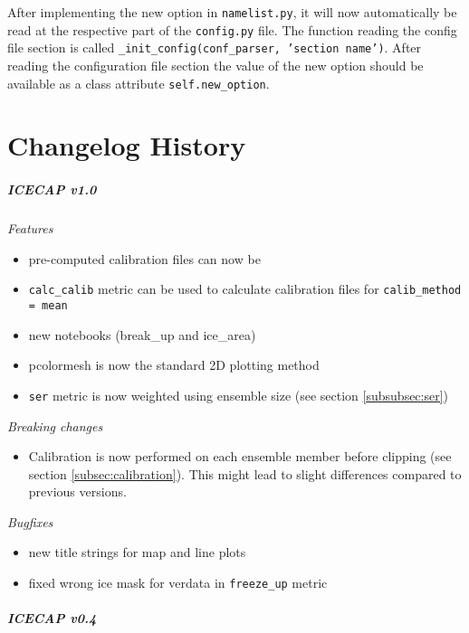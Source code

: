 \documentclass[DIV=10, parskip=full]{scrreprt}
\newcommand{\ice}{\textit{ICECAP}\xspace}
\begin{document}
After implementing the new option in \texttt{namelist.py}, it will now automatically be read at the respective part of the \texttt{config.py} file. The function reading the config file section is called \texttt{\_init\_config(conf\_parser, 'section name')}. After reading the configuration file section the value of the new option should be available as a class attribute \texttt{self.new\_option}.

\chapter{Changelog History}

\paragraph{\textbf{\ice v1.0\\[5pt]}}
\textit{Features}
\begin{itemize}
	\item pre-computed calibration files can now be 
	\item \texttt{calc\_calib} metric can be used to calculate calibration files for \texttt{calib\_method = mean}
	\item new notebooks (break\_up and ice\_area)
	\item pcolormesh is now the standard 2D plotting method
	\item \texttt{ser} metric is now weighted using ensemble size (see section \ref{subsubsec:ser})
\end{itemize}

\textit{Breaking changes}
\begin{itemize}
	\item Calibration is now performed on each ensemble member before clipping (see section \ref{subsec:calibration}). This might lead to slight differences compared to previous versions.
\end{itemize}

\textit{Bugfixes}
\begin{itemize}
	\item new title strings for map and line plots
	\item fixed wrong ice mask for verdata in \texttt{freeze\_up} metric
\end{itemize}

\paragraph{\textbf{\ice v0.4\\[5pt]}}
\end{document}
